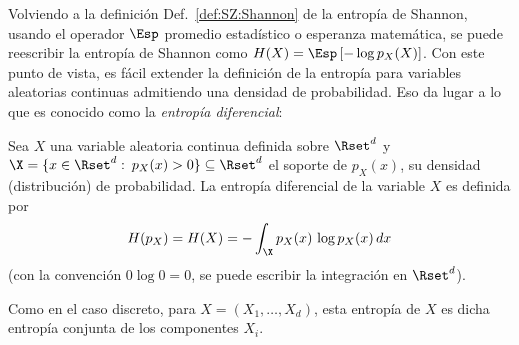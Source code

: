 
\label{sec:SZ:Diferencial}

Volviendo  a  la  definici\'on  Def.~\ref{def:SZ:Shannon} de  la  entrop\'ia  de
Shannon,  usando   el  operador   $\Esp$  promedio  estad\'istico   o  esperanza
matem\'atica,  se  puede  reescribir  la  entrop\'ia de  Shannon  como  $H(X)  =
\Esp\left[ - \log p_X(X) \right]$.  Con este punto de vista, es f\'acil extender
la definici\'on de la  entrop\'ia para variables aleatorias continuas admitiendo
una densidad de  probabilidad.  Eso da lugar  a lo que es conocido  como la {\it
  entrop\'ia diferencial}:

\begin{definicion}\label{def:SZ:EntropiaDiferencial}
  Sea $X$ una variable aleatoria continua  definida sobre $\Rset^d$ y $\X = \{ x
  \in \Rset^d:  \: p_X(x) > 0 \}  \subseteq \Rset^d$ el soporte  de $p_X(x)$, su
  densidad  (distribuci\'on) de  probabilidad. La  entrop\'ia diferencial  de la
  variable $X$ es definida por
  \[
  H(p_X) = H(X) = - \int_\X p_X(x) \, \log p_X(x) \, dx
  \]
  (con la  convenci\'on $0 \log  0 = 0$,  se puede escribir la  integraci\'on en
  $\Rset^d$).
\end{definicion}
%
Como en el caso discreto, para $X = (X_1,\ldots,X_d)$, esta entrop\'ia de $X$ es
dicha entrop\'ia conjunta de los componentes $X_i$.

